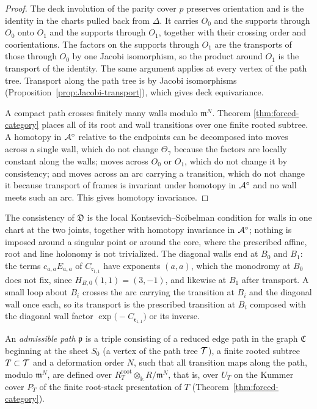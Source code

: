 \begin{proof}
The deck involution of the parity cover $p$ preserves orientation and is
the identity in the charts pulled back from $\Delta$.  It carries $O_0$ and
the supports through $O_0$ onto $O_1$ and the supports through $O_1$,
together with their crossing order and coorientations.  The factors on the
supports through $O_1$ are the transports of those through $O_0$ by one
Jacobi isomorphism, so the product around $O_1$ is the transport of the
identity.  The same argument applies at
every vertex of the path tree.  Transport along the path tree is by Jacobi
isomorphisms (Proposition~\ref{prop:Jacobi-transport}), which gives deck
equivariance.

A compact path crosses finitely many walls modulo $\mathfrak m^N$.  Theorem
\ref{thm:forced-category} places all of its root and wall transitions over
one finite rooted subtree.  A homotopy in $\mathcal A^\circ$ relative to the
endpoints can be decomposed into moves across a single wall, which do not
change $\Theta_\gamma$ because the factors are locally constant along the walls;
moves across $O_0$ or $O_1$, which do not change it by consistency; and
moves across an arc carrying a transition, which do not change it because
transport of frames is invariant under homotopy in $\mathcal A^\circ$ and no wall
meets such an arc.  This gives homotopy invariance.
\end{proof}

The consistency of $\mathfrak D$ is the local
Kontsevich--Soibelman condition for walls in one chart at the two joints,
together with homotopy invariance in $\mathcal A^\circ$; nothing is imposed around a singular point or around the
core, where the prescribed affine, root and line holonomy is not
trivialized.  The diagonal walls end at $B_0$ and $B_1$: the terms
$c_{a,a}E_{a,a}$ of $C_{\mathfrak r_{1,1}}$ have exponents $(a,a)$, which
the monodromy at $B_0$ does not fix, since $H_{B,0}(1,1)=(3,-1)$, and
likewise at $B_1$ after transport.  A small loop about $B_i$ crosses the arc
carrying the transition at $B_i$ and the diagonal wall once each, so its
transport is the prescribed transition at $B_i$ composed with the diagonal
wall factor $\exp\bigl(-C_{\mathfrak r_{1,1}}\bigr)$ or its inverse.

\begin{definition}\label{def:framed-path}
An \emph{admissible path} $\mathfrak p$ is a triple consisting of a reduced
edge path in the graph $\mathfrak C$ beginning at the sheet $S_0$ (a vertex
of the path tree $\mathcal T$), a finite rooted subtree $T\subset\mathcal T$ and a
deformation order $N$, such that all transition maps along the path, modulo
$\mathfrak m^N$, are defined over
$R_T^{\mathrm{root}}\otimes_\Bbbk R/\mathfrak m^N$, that is, over $U_T$ on
the Kummer cover $P_T$ of the finite root-stack presentation of $T$
(Theorem~\ref{thm:forced-category}).
\end{definition}

